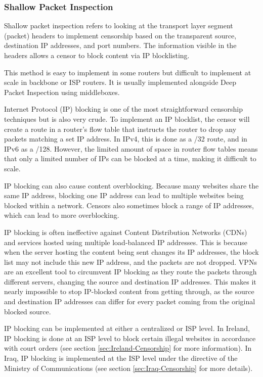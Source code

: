 \subsubsection{Shallow Packet Inspection}

Shallow packet inspection refers to looking at the transport layer segment (packet) headers to implement censorship based on the transparent source, destination IP addresses, and port numbers. The information visible in the headers allows a censor to block content via IP blocklisting.

This method is easy to implement in some routers but difficult to implement at scale in backbone or ISP routers. It is usually implemented alongside Deep Packet Inspection using middleboxes.

Internet Protocol (IP) blocking is one of the most straightforward censorship techniques but is also very crude. To implement an IP blocklist, the censor will create a route in a router's flow table that instructs the router to drop any packets matching a set IP address. In IPv4, this is done as a /32 route, and in IPv6 as a /128. However, the limited amount of space in router flow tables means that only a limited number of IPs can be blocked at a time, making it difficult to scale.

IP blocking can also cause content overblocking. Because many websites share the same IP address, blocking one IP address can lead to multiple websites being blocked within a network. Censors also sometimes block a range of IP addresses, which can lead to more overblocking.

IP blocking is often ineffective against Content Distribution Networks (CDNs) and services hosted using multiple load-balanced IP addresses. This is because when the server hosting the content being sent changes its IP addresses, the block list may not include this new IP address, and the packets are not dropped. VPNs are an excellent tool to circumvent IP blocking as they route the packets through different servers, changing the source and destination IP addresses. This makes it nearly impossible to stop IP-blocked content from getting through, as the source and destination IP addresses can differ for every packet coming from the original blocked source.

IP blocking can be implemented at either a centralized or ISP level. In Ireland, IP blocking is done at an ISP level to block certain illegal websites in accordance with court orders (see section \ref{sec:Ireland-Censorship} for more information). In Iraq, IP blocking is implemented at the ISP level under the directive of the Ministry of Communications \cite{freedomhouseIraqFreedom} (see section \ref{sec:Iraq-Censorship} for more details).

